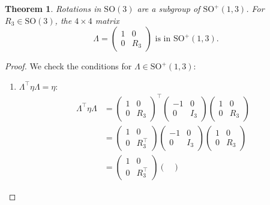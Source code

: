 \documentclass{amsart}
\newtheorem{theorem}{Theorem}[section]
\theoremstyle{definition}
\theoremstyle{remark}
\begin{document}
\begin{theorem}\label{thm:so3_rotations_in_so13}
  Rotations in $\mathrm{SO}(3)$ are a subgroup of $\mathrm{SO}^+(1,3)$.
  For $R_3\in\mathrm{SO}(3)$, the $4 \times 4$ matrix
  \begin{equation*}
    \Lambda =
    \begin{pmatrix}
      1 & 0 \\
      0 & R_3
    \end{pmatrix} \text{ is in } \mathrm{SO}^+(1,3).
  \end{equation*}
\end{theorem}
\begin{proof}
  We check the conditions for $\Lambda \in \mathrm{SO}^+(1,3)$:
  \begin{enumerate}
      \item $\Lambda^\top \eta \Lambda = \eta$:
        \begin{align*}
          \Lambda^\top\eta \Lambda &=
          \begin{pmatrix}
            1 & 0 \\
            0 & R_3
          \end{pmatrix}^\top
          \begin{pmatrix}
            -1 & 0 \\
            0 & I_3
          \end{pmatrix}
          \begin{pmatrix}
            1 & 0 \\
            0 & R_3
          \end{pmatrix} \\
          &=
          \begin{pmatrix}
            1 & 0 \\
            0 & R_3^\top
          \end{pmatrix}
          \begin{pmatrix}
            -1 & 0 \\
            0 & I_3
          \end{pmatrix}
          \begin{pmatrix}
            1 & 0 \\
            0 & R_3
          \end{pmatrix} \\
          &=
          \begin{pmatrix}
            1 & 0 \\
            0 & R_3^\top
          \end{pmatrix}
          \begin{pmatrix}

\end{pmatrix}
\end{align*}
\end{enumerate}
\end{proof}
\end{document}
